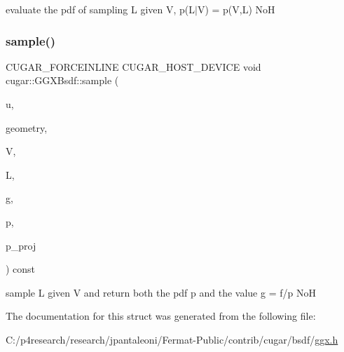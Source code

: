 evaluate the pdf of sampling L given V, p(L$\vert$V) = p(\+V,\+L) NoH \mbox{\label{structcugar_1_1_g_g_x_bsdf_ab531cb23b74cb1f66a1885f68d8de64b}} 
\subsubsection{\texorpdfstring{sample()}{sample()}}
{\footnotesize\ttfamily C\+U\+G\+A\+R\+\_\+\+F\+O\+R\+C\+E\+I\+N\+L\+I\+NE C\+U\+G\+A\+R\+\_\+\+H\+O\+S\+T\+\_\+\+D\+E\+V\+I\+CE void cugar\+::\+G\+G\+X\+Bsdf\+::sample (\begin{DoxyParamCaption}\item[{const \hyperlink{structcugar_1_1_vector}{Vector3f}}]{u,  }\item[{const \hyperlink{structcugar_1_1_differential_geometry}{Differential\+Geometry} \&}]{geometry,  }\item[{const \hyperlink{structcugar_1_1_vector}{Vector3f}}]{V,  }\item[{\hyperlink{structcugar_1_1_vector}{Vector3f} \&}]{L,  }\item[{\hyperlink{structcugar_1_1_vector}{Vector3f} \&}]{g,  }\item[{float \&}]{p,  }\item[{float \&}]{p\+\_\+proj }\end{DoxyParamCaption}) const\hspace{0.3cm}{\ttfamily [inline]}}

sample L given V and return both the pdf p and the value g = f/p NoH 

The documentation for this struct was generated from the following file\+:\begin{DoxyCompactItemize}
\item 
C\+:/p4research/research/jpantaleoni/\+Fermat-\/\+Public/contrib/cugar/bsdf/\hyperlink{ggx_8h}{ggx.\+h}\end{DoxyCompactItemize}

